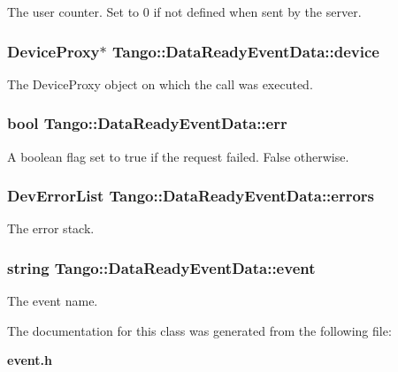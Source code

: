 The user counter. Set to 0 if not defined when sent by the server. 

\subsubsection[{device}]{\setlength{\rightskip}{0pt plus 5cm}Device\-Proxy$\ast$ Tango\-::\-Data\-Ready\-Event\-Data\-::device}\label{classTango_1_1DataReadyEventData_a7df862854af7b80913dcb9dd1d330a64}


The Device\-Proxy object on which the call was executed. 

\subsubsection[{err}]{\setlength{\rightskip}{0pt plus 5cm}bool Tango\-::\-Data\-Ready\-Event\-Data\-::err}\label{classTango_1_1DataReadyEventData_afc55fe4eee219eea959e8ad53d34f310}


A boolean flag set to true if the request failed. False otherwise. 

\subsubsection[{errors}]{\setlength{\rightskip}{0pt plus 5cm}Dev\-Error\-List Tango\-::\-Data\-Ready\-Event\-Data\-::errors}\label{classTango_1_1DataReadyEventData_acc8ce497a9b75d7db6878472ae471995}


The error stack. 

\subsubsection[{event}]{\setlength{\rightskip}{0pt plus 5cm}string Tango\-::\-Data\-Ready\-Event\-Data\-::event}\label{classTango_1_1DataReadyEventData_a90279b05b0751e18e8f348c0a41848fa}


The event name. 



The documentation for this class was generated from the following file\-:\begin{DoxyCompactItemize}
\item 
{\bf event.\-h}\end{DoxyCompactItemize}
